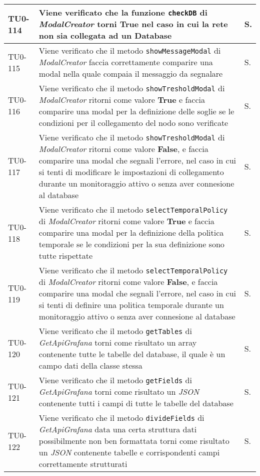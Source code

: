 \begin{longtable}{|C{.15\textwidth}|m{.66\textwidth}|C{.10\textwidth}|}
\hline
TU0-114 & Viene verificato che la funzione \texttt{checkDB} di \textit{ModalCreator} torni \textbf{True} nel caso in cui la rete non sia collegata ad un Database & S. \\
\hline
{}TU0-115 & Viene verificato che il metodo \texttt{showMessageModal} di \textit{ModalCreator} faccia correttamente comparire una modal nella quale compaia il messaggio da segnalare & S. \\
\hline
TU0-116 & Viene verificato che il metodo \texttt{showTresholdModal} di \textit{ModalCreator} ritorni come valore \textbf{True} e faccia comparire una modal per la definizione delle soglie se le condizioni per il collegamento del nodo sono verificate & S. \\
\hline
{}TU0-117 & Viene verificato che il metodo \texttt{showTresholdModal} di \textit{ModalCreator} ritorni come valore \textbf{False}, e faccia comparire una modal che segnali l'errore, nel caso in cui si tenti di modificare le impostazioni di collegamento durante un monitoraggio attivo o senza aver connesione al database  & S. \\
\hline
TU0-118 & Viene verificato che il metodo \texttt{selectTemporalPolicy} di \textit{ModalCreator} ritorni come valore \textbf{True} e faccia comparire una modal per la definizione della politica temporale se le condizioni per la sua definizione sono tutte rispettate & S. \\
\hline
{}TU0-119 & Viene verificato che il metodo \texttt{selectTemporalPolicy} di \textit{ModalCreator} ritorni come valore \textbf{False}, e faccia comparire una modal che segnali l'errore, nel caso in cui si tenti di definire una politica temporale durante un monitoraggio attivo o senza aver connesione al database & S. \\
\hline
TU0-120 & Viene verificato che il metodo \texttt{getTables} di \textit{GetApiGrafana} torni come risultato un array contenente tutte le tabelle del database, il quale è un campo dati della classe stessa & S.\\
\hline
{}TU0-121 & Viene verificato che il metodo \texttt{getFields} di \textit{GetApiGrafana} torni come risultato un \textit{JSON} contenente tutti i campi di tutte le tabelle del database & S.\\
\hline
TU0-122 & Viene verificato che il metodo \texttt{divideFields} di \textit{GetApiGrafana} data una certa struttura dati possibilmente non ben formattata torni come risultato un \textit{JSON} contenente tabelle e corrispondenti campi correttamente strutturati & S.\\

\end{longtable}
